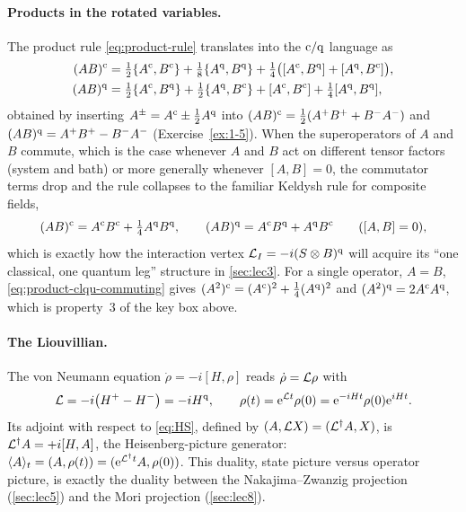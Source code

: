 \paragraph{Products in the rotated variables.}
The product rule \cref{eq:product-rule} translates into the $\mathrm{c}/\mathrm{q}$ language as
\begin{equation}
\begin{aligned}
  (AB)^{\mathrm{c}}&=\tfrac12\{A^{\mathrm{c}},B^{\mathrm{c}}\}+\tfrac18\{A^{\mathrm{q}},B^{\mathrm{q}}\}+\tfrac14\big([A^{\mathrm{c}},B^{\mathrm{q}}]+[A^{\mathrm{q}},B^{\mathrm{c}}]\big),\\
  (AB)^{\mathrm{q}}&=\tfrac12\{A^{\mathrm{c}},B^{\mathrm{q}}\}+\tfrac12\{A^{\mathrm{q}},B^{\mathrm{c}}\}+[A^{\mathrm{c}},B^{\mathrm{c}}]+\tfrac14[A^{\mathrm{q}},B^{\mathrm{q}}],
\end{aligned}
  \label{eq:product-clqu}
\end{equation}
obtained by inserting $A^\pm=A^{\mathrm{c}}\pm\tfrac12A^{\mathrm{q}}$ into $(AB)^{\mathrm{c}}=\tfrac12(A^+B^++B^-A^-)$ and $(AB)^{\mathrm{q}}=A^+B^+-B^-A^-$ (Exercise~\ref{ex:1-5}).
When the superoperators of $A$ and $B$ commute, which is the case whenever $A$ and $B$ act on different tensor factors (system and bath) or more generally whenever $[A,B]=0$, the commutator terms drop and the rule collapses to the familiar Keldysh rule for composite fields,
\begin{equation}
  (AB)^{\mathrm{c}}=A^{\mathrm{c}}B^{\mathrm{c}}+\tfrac14A^{\mathrm{q}}B^{\mathrm{q}},\qquad (AB)^{\mathrm{q}}=A^{\mathrm{c}}B^{\mathrm{q}}+A^{\mathrm{q}}B^{\mathrm{c}}\qquad([A,B]=0),
  \label{eq:product-clqu-commuting}
\end{equation}
which is exactly how the interaction vertex $\mathcal{L}_I=-i(S\otimes B)^{\mathrm{q}}$ will acquire its ``one classical, one quantum leg'' structure in \cref{sec:lec3}.
For a single operator, $A=B$, \cref{eq:product-clqu-commuting} gives $(A^2)^{\mathrm{c}}=(A^{\mathrm{c}})^2+\tfrac14(A^{\mathrm{q}})^2$ and $(A^2)^{\mathrm{q}}=2A^{\mathrm{c}} A^{\mathrm{q}}$, which is property~3 of the key box above.

\paragraph{The Liouvillian.}
The von Neumann equation $\dot\rho=-i[H,\rho]$ reads $\dot\rho=\mathcal{L}\rho$ with
\begin{equation}
  \mathcal{L}=-i\big(H^{+}-H^{-}\big)=-iH^{\mathrm{q}} ,\qquad \rho(t)=\mathrm{e}^{\mathcal{L} t}\rho(0)=\mathrm{e}^{-iHt}\rho(0)\mathrm{e}^{iHt}.
\end{equation}
Its adjoint with respect to \cref{eq:HS}, defined by $(A,\mathcal{L} X)=(\mathcal{L}^\dagger A,X)$, is $\mathcal{L}^\dagger A=+i[H,A]$, the Heisenberg-picture generator: $\langle A\rangle_t=(A,\rho(t))=(\mathrm{e}^{\mathcal{L}^\dagger t}A,\rho(0))$.
This duality, state picture versus operator picture, is exactly the duality between the Nakajima--Zwanzig projection (\cref{sec:lec5}) and the Mori projection (\cref{sec:lec8}).

